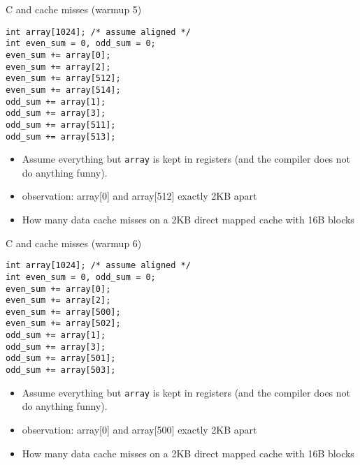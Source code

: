 \begin{frame}[fragile,label=arrayMissesWarmup5]{C and cache misses (warmup 5)}
\begin{lstlisting}[style=smaller]
int array[1024]; /* assume aligned */
int even_sum = 0, odd_sum = 0;
even_sum += array[0];
even_sum += array[2];
even_sum += array[512];
even_sum += array[514];
odd_sum += array[1];
odd_sum += array[3];
odd_sum += array[511];
odd_sum += array[513];
\end{lstlisting}
\begin{itemize}
\item {\small
Assume everything but {\tt array} is kept in registers (and the compiler does not do
anything funny).}
\item observation: array[0] and array[512] exactly 2KB apart
\item How many data cache misses on a 2KB direct mapped cache with 16B blocks
\end{itemize}
\end{frame}

\begin{frame}[fragile,label=arrayMissesWarmup6]{C and cache misses (warmup 6)}
\begin{lstlisting}[style=smaller]
int array[1024]; /* assume aligned */
int even_sum = 0, odd_sum = 0;
even_sum += array[0];
even_sum += array[2];
even_sum += array[500];
even_sum += array[502];
odd_sum += array[1];
odd_sum += array[3];
odd_sum += array[501];
odd_sum += array[503];
\end{lstlisting}
\begin{itemize}
\item {\small
Assume everything but {\tt array} is kept in registers (and the compiler does not do
anything funny).}
\item observation: array[0] and array[500] exactly 2KB apart
\item How many data cache misses on a 2KB direct mapped cache with 16B blocks
\end{itemize}
\end{frame}

